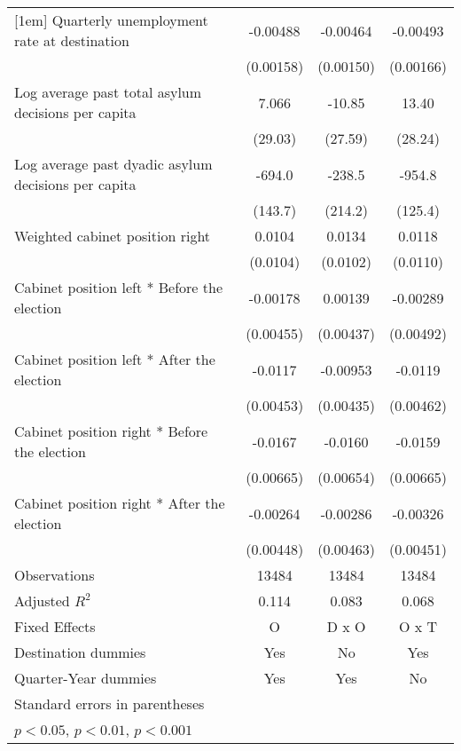 \begin{table}[htbp]
\begin{tabular}{l*{3}{c}}
[1em]
Quarterly unemployment rate at destination&    -0.00488\sym{**} &    -0.00464\sym{**} &    -0.00493\sym{**} \\
                    &   (0.00158)         &   (0.00150)         &   (0.00166)         \\
[1em]
Log average past total asylum decisions per capita&       7.066         &      -10.85         &       13.40         \\
                    &     (29.03)         &     (27.59)         &     (28.24)         \\
[1em]
Log average past dyadic asylum decisions per capita&      -694.0\sym{***}&      -238.5         &      -954.8\sym{***}\\
                    &     (143.7)         &     (214.2)         &     (125.4)         \\
[1em]
Weighted cabinet position right&      0.0104         &      0.0134         &      0.0118         \\
                    &    (0.0104)         &    (0.0102)         &    (0.0110)         \\
[1em]
Cabinet position left * Before the election&    -0.00178         &     0.00139         &    -0.00289         \\
                    &   (0.00455)         &   (0.00437)         &   (0.00492)         \\
[1em]
Cabinet position left * After the election&     -0.0117\sym{*}  &    -0.00953\sym{*}  &     -0.0119\sym{*}  \\
                    &   (0.00453)         &   (0.00435)         &   (0.00462)         \\
[1em]
Cabinet position right * Before the election&     -0.0167\sym{*}  &     -0.0160\sym{*}  &     -0.0159\sym{*}  \\
                    &   (0.00665)         &   (0.00654)         &   (0.00665)         \\
[1em]
Cabinet position right * After the election&    -0.00264         &    -0.00286         &    -0.00326         \\
                    &   (0.00448)         &   (0.00463)         &   (0.00451)         \\
\hline
Observations        &       13484         &       13484         &       13484         \\
Adjusted \(R^{2}\)  &       0.114         &       0.083         &       0.068         \\
Fixed Effects       &           O         &       D x O         &       O x T         \\
Destination dummies &         Yes         &          No         &         Yes         \\
Quarter-Year dummies&         Yes         &         Yes         &          No         \\
\hline\hline
\multicolumn{4}{l}{\footnotesize Standard errors in parentheses}\\
\multicolumn{4}{l}{\footnotesize \sym{*} \(p<0.05\), \sym{**} \(p<0.01\), \sym{***} \(p<0.001\)}\\
\end{tabular}
\end{table}
